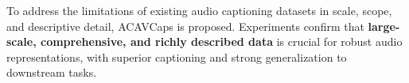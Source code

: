 \vspace{0.3cm}
To address the limitations of existing audio captioning datasets in scale, scope, and descriptive detail, ACAVCaps is proposed. Experiments confirm that \textbf{large-scale, comprehensive, and richly described data} is crucial for robust audio representations, with superior captioning and strong generalization to downstream tasks.

\vspace{2.0cm}
\begin{center}
\qrcode{\PosterRepositoryUrl}

\vspace{1.5cm}
\Large\textbf{\PosterRepositoryText}
\end{center}
